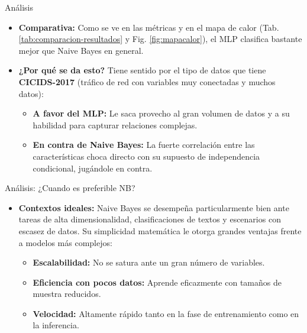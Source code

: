 \documentclass{beamer}
\begin{document}
\begin{frame}{Análisis}
    \begin{itemize}
        \item \textbf{Comparativa:} Como se ve en las métricas y en el mapa de calor (Tab. \ref{tab:comparacion-resultados} y Fig. \ref{fig:mapacalor}), el MLP clasifica bastante mejor que Naive Bayes en general.
        
        \item \textbf{¿Por qué se da esto?} Tiene sentido por el tipo de datos que tiene \textbf{CICIDS-2017} (tráfico de red con variables muy conectadas y muchos datos):
        
        \begin{itemize}
            \item \textbf{A favor del MLP:} Le saca provecho al gran volumen de datos y a su habilidad para capturar relaciones complejas.
            
            \item \textbf{En contra de Naive Bayes:} La fuerte correlación entre las características choca directo con su supuesto de independencia condicional, jugándole en contra.
        \end{itemize}
    \end{itemize}
\end{frame}


\begin{frame}{Análisis: ¿Cuando es preferible NB?}

    \begin{itemize}
        \item \textbf{Contextos ideales:} Naive Bayes se desempeña particularmente bien ante tareas de alta dimensionalidad, clasificaciones de textos y escenarios con escasez de datos. Su simplicidad matemática le otorga grandes ventajas frente a modelos más complejos:
        \begin{itemize}
            \item \textbf{Escalabilidad:} No se satura ante un gran número de variables.

            \smallskip
            
            \item \textbf{Eficiencia con pocos datos:} Aprende eficazmente con tamaños de muestra reducidos.

            \smallskip
            
            \item \textbf{Velocidad:} Altamente rápido tanto en la fase de entrenamiento como en la inferencia.
        \end{itemize}
    \end{itemize}
\end{frame}
\end{document}
